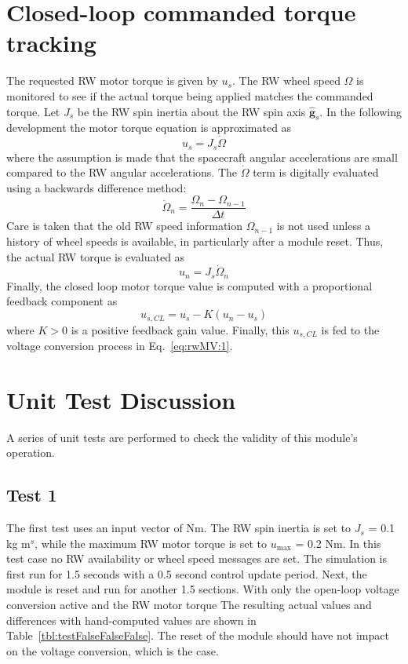 \documentclass[]{BasiliskReportMemo}
\begin{document}
\section{Closed-loop commanded torque tracking}
The requested RW motor torque is given by $u_{s}$.  The RW wheel speed $\Omega$ is monitored to see if the actual torque being applied matches the commanded torque.  Let $J_{s}$ be the RW spin inertia about the RW spin axis $\hat{\bm g}_{s}$.   In the following development the motor torque equation is approximated as
\begin{equation}
	u_{s} = J_{s} \dot\Omega
\end{equation}
where the assumption is made that the spacecraft angular accelerations are small compared to the RW angular accelerations.  The $\dot\Omega$ term is digitally evaluated using a backwards difference method:
\begin{equation}
	\dot\Omega_{n} = \frac{\Omega_{n} - \Omega_{n-1}}{\Delta t}
\end{equation}
Care is taken that the old RW speed information $\Omega_{n-1}$ is not used unless a history of wheel speeds is available, in particularly after a module reset.  Thus, the actual RW torque is evaluated as
\begin{equation}
	u_{n} = J_{s} \dot\Omega_{n}
\end{equation}
Finally, the closed loop motor torque value is computed with a proportional feedback component as
\begin{equation}
	u_{s,CL} = u_{s} - K (u_{n} - u_{s})
\end{equation}
where $K>0$ is a positive feedback gain value.  Finally, this $u_{s,CL}$ is fed to the voltage conversion process in Eq.~\eqref{eq:rwMV:1}.  




\section{Unit Test Discussion}
A series of unit tests are performed to check the validity of this module's operation.

\subsection{Test 1}
The first test uses an input vector of  Nm.  The RW spin inertia is set to $J_{s}$ = 0.1 kg m$^{s}$, while the maximum RW motor torque is set to $u_{\text{max}}$ = 0.2 Nm.  In this test case no RW availability or wheel speed messages are set.  The simulation is first run for 1.5 seconds with a 0.5 second control update period.  Next, the module is reset and run for another 1.5 sections.  With only the open-loop voltage conversion active and the RW motor torque
The resulting actual values and differences with hand-computed values are shown in Table~\ref{tbl:testFalseFalseFalse}.  The reset of the module should have not impact on the voltage conversion, which is the case.
\end{document}
